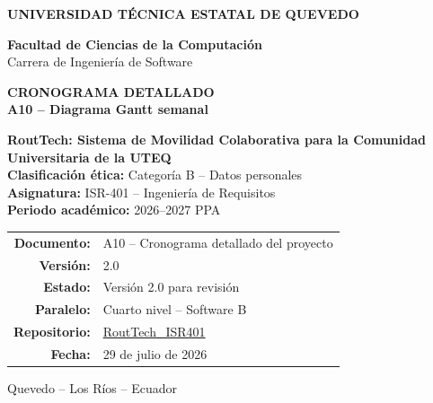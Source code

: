 \documentclass[10pt,a4paper]{article}
\newcommand{\Proyecto}{RoutTech: Sistema de Movilidad Colaborativa para la Comunidad Universitaria de la UTEQ}
\newcommand{\Asignatura}{ISR-401 -- Ingeniería de Requisitos}
\newcommand{\Periodo}{2026--2027 PPA}
\newcommand{\CategoriaEtica}{Categoría B -- Datos personales}
\newcommand{\Repositorio}{https://github.com/AnderJM3/RoutTech_ISR401}
\newcommand{\FechaDocumento}{29 de julio de 2026}
\newcommand{\VersionDocumento}{2.0}
\newcommand{\Paralelo}{Cuarto nivel -- Software B}
\begin{document}
\justifying

\thispagestyle{empty}

\vspace*{0.65cm}
\begin{center}
{\color{white}\Large\bfseries UNIVERSIDAD TÉCNICA ESTATAL DE QUEVEDO}

\vspace{1.75cm}
{\large\bfseries\color{RTForest} Facultad de Ciencias de la Computación\\[4pt]}
{\normalsize\color{RTGray} Carrera de Ingeniería de Software}

\vspace{0.8cm}

{\Huge\bfseries\color{RTForest} CRONOGRAMA DETALLADO\\[8pt]}
{\Large\bfseries\color{RTTerracotta} A10 -- Diagrama Gantt semanal}

\vspace{1.0cm}

\begin{minipage}{0.90\textwidth}
\centering
\setlength{\fboxsep}{10pt}
\colorbox{RTCream}{%
\parbox{0.88\textwidth}{
\centering
{\large\bfseries \Proyecto}\\[7pt]
\textbf{Clasificación ética:} \CategoriaEtica\\
\textbf{Asignatura:} \Asignatura\\
\textbf{Periodo académico:} \Periodo
}}
\end{minipage}

\vfill
\begin{tabular}{rl}
\textbf{Documento:} & A10 -- Cronograma detallado del proyecto\\
\textbf{Versión:} & \VersionDocumento\\
\textbf{Estado:} & Versión 2.0 para revisión\\
\textbf{Paralelo:} & \Paralelo\\
\textbf{Repositorio:} & \href{\Repositorio}{RoutTech\_ISR401}\\
\textbf{Fecha:} & \FechaDocumento
\end{tabular}

\vspace{0.75cm}
{\small Quevedo -- Los Ríos -- Ecuador}
\end{center}
\clearpage
\end{document}
